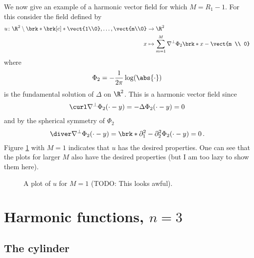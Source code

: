 We now give an example of a harmonic vector field
for which $M=R_1-1$.
For this consider the field defined by
\begin{align*}
  u\colon\R^2\setminus\brk*{\brk[c]*{\vect{1\\0},\dots,\vect{m\\0}}}&\to\R^2 \\
  x&\mapsto\sum_{m=1}^M\nabla^\perp\Phi_2\brk*{x-\vect{m \\ 0}}
\end{align*}
where
\begin{align*}
  \Phi_2=-\frac{1}{2\pi}\log(\abs{\cdot})
\end{align*}
is the fundamental solution of $\Delta$ on $\R^2$. This is a harmonic vector field since
\begin{align*}
  \curl \nabla^\perp\Phi_2(\cdot-y)= -\Delta\Phi_2(\cdot-y)=0
\end{align*}
and by the spherical symmetry of $\Phi_2$
\begin{align*}
  \diver \nabla^\perp\Phi_2(\cdot-y) = \brk*{\partial_1^2-\partial_2^2}\Phi_2(\cdot-y)=0\,.
\end{align*}
Figure \ref{pl:n2_hvf_noInflowNoOutflow} with $M=1$ indicates that $u$ has the desired properties. One can see that
the plots for larger
$M$ also have the desired properties (but I am too lazy to show them here).
\begin{figure}
  \centering
  
  \caption{A plot of $u$ for $M=1$ (TODO: This looks awful).}
  \label{pl:n2_hvf_noInflowNoOutflow}
\end{figure}

\newpage

\section*{Harmonic functions, $n=3$}

\subsection*{The cylinder}

